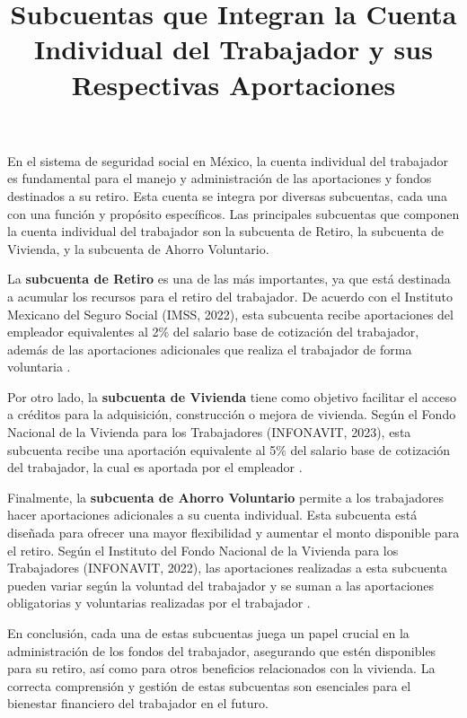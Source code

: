 \documentclass[a4paper,12pt]{article}
\title{Subcuentas que Integran la Cuenta Individual del Trabajador y sus Respectivas Aportaciones}
\author{}
\date{}
\begin{document}
\maketitle

En el sistema de seguridad social en México, la cuenta individual del trabajador es fundamental para el manejo y administración de las aportaciones y fondos destinados a su retiro. Esta cuenta se integra por diversas subcuentas, cada una con una función y propósito específicos. Las principales subcuentas que componen la cuenta individual del trabajador son la subcuenta de Retiro, la subcuenta de Vivienda, y la subcuenta de Ahorro Voluntario.

La \textbf{subcuenta de Retiro} es una de las más importantes, ya que está destinada a acumular los recursos para el retiro del trabajador. De acuerdo con el Instituto Mexicano del Seguro Social (IMSS, 2022), esta subcuenta recibe aportaciones del empleador equivalentes al 2\% del salario base de cotización del trabajador, además de las aportaciones adicionales que realiza el trabajador de forma voluntaria \parencite{IMSS2022}.

Por otro lado, la \textbf{subcuenta de Vivienda} tiene como objetivo facilitar el acceso a créditos para la adquisición, construcción o mejora de vivienda. Según el Fondo Nacional de la Vivienda para los Trabajadores (INFONAVIT, 2023), esta subcuenta recibe una aportación equivalente al 5\% del salario base de cotización del trabajador, la cual es aportada por el empleador \parencite{INFONAVIT2023}.

Finalmente, la \textbf{subcuenta de Ahorro Voluntario} permite a los trabajadores hacer aportaciones adicionales a su cuenta individual. Esta subcuenta está diseñada para ofrecer una mayor flexibilidad y aumentar el monto disponible para el retiro. Según el Instituto del Fondo Nacional de la Vivienda para los Trabajadores (INFONAVIT, 2022), las aportaciones realizadas a esta subcuenta pueden variar según la voluntad del trabajador y se suman a las aportaciones obligatorias y voluntarias realizadas por el trabajador \parencite{INFONAVIT2022}.

En conclusión, cada una de estas subcuentas juega un papel crucial en la administración de los fondos del trabajador, asegurando que estén disponibles para su retiro, así como para otros beneficios relacionados con la vivienda. La correcta comprensión y gestión de estas subcuentas son esenciales para el bienestar financiero del trabajador en el futuro.
\end{document}
